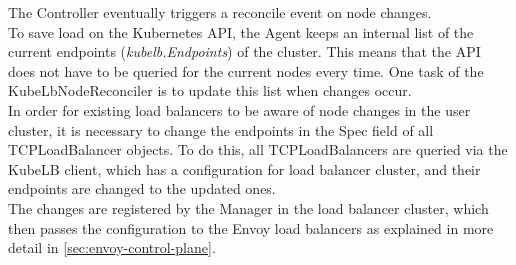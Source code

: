The Controller eventually triggers a reconcile event on node changes.
\\
To save load on the Kubernetes API, the Agent keeps an internal list of the current endpoints (\textit{kubelb.Endpoints}) of the cluster.
This means that the API does not have to be queried for the current nodes every time.
One task of the KubeLbNodeReconciler is to update this list when changes occur.
\\
In order for existing load balancers to be aware of node changes in the user cluster, it is necessary to change the endpoints in the Spec field of all TCPLoadBalancer objects.
To do this, all TCPLoadBalancers are queried via the KubeLB client, which has a configuration for load balancer cluster, and their endpoints are changed to the updated ones.
\\
The changes are registered by the Manager in the load balancer cluster, which then passes the configuration to the Envoy load balancers as explained in more detail in \autoref{sec:envoy-control-plane}.
\\
